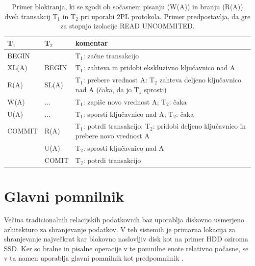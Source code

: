 \documentclass[a4paper, 12pt]{book}
\begin{document}
\begin{table}[H]
\begin{center}
\begin{tabular}{p{}|p{}|p{}} 
    \textbf{T$_{\text{1}}$} & \textbf{T$_{\text{2}}$} & \textbf{komentar} \\
\hline
BEGIN  &        & T$_{\text{1}}$: začne transakcijo \\
XL(A)  & BEGIN  & T$_{\text{1}}$: zahteva in pridobi ekskluzivno ključavnico nad A \\
R(A)   & SL(A)  & T$_{\text{1}}$: prebere vrednost A: T$_{\text{2}}$ zahteva deljeno ključavnico nad A (čaka, da jo T$_{\text{1}}$ sprosti) \\
W(A)   & ...    & T$_{\text{1}}$: zapiše novo vrednost A; T$_{\text{2}}$: čaka  \\
U(A)   & ...    & T$_{\text{1}}$: sporsti ključavnico nad A; T$_{\text{2}}$: čaka \\
COMMIT & R(A)    & T$_{\text{1}}$: potrdi transakcijo; T$_{\text{2}}$: pridobi deljeno ključavnico in prebere novo vrednost A \\
       & U(A)   & T$_{\text{2}}$: sprosti ključavnico nad A \\
       & COMIT  & T$_{\text{2}}$: potrdi transakcijo \\
\end{tabular}
\end{center}
\caption{Primer \cite{lecture-2pl} blokiranja, ki se zgodi ob sočasnem pisanju (W(A)) in branju (R(A)) dveh transakcij T$_{\text{1}}$ in T$_{\text{2}}$ pri uporabi 2PL protokola. Primer predpostavlja, da gre za stopnjo izolacije READ UNCOMMITED. }
\label{tbl_cc_2pl_example}
\end{table}

\section{Glavni pomnilnik}

Večina tradicionalnih relacijskih podatkovnih baz uporablja diskovno usmerjeno arhitekturo za shranjevanje podatkov. V teh sistemih je primarna lokacija za shranjevanje največkrat kar blokovno naslovljiv disk kot na primer HDD oziroma SSD. Ker so bralne in pisalne operacije v te pomnilne enote relativno počasne, se v ta namen uporablja glavni pomnilnik kot predpomnilnik \cite{Pavlo2016Sep}.
\end{document}
